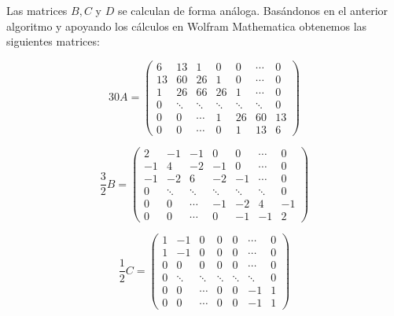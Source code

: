 Las matrices $B, C $ y $ D$ se calculan de forma análoga. Basándonos en el anterior algoritmo y apoyando los cálculos en  Wolfram Mathematica obtenemos las siguientes matrices:

\begin{equation}
\label{a}
    30A=\begin{pmatrix}
         6 & 13 & 1 & 0 & 0 & \cdots & 0\\
         13 & 60 & 26 & 1 & 0 &  \cdots & 0\\
         1 & 26 & 66 & 26 & 1 &  \cdots & 0\\
         0 & \ddots & \ddots & \ddots & \ddots &\ddots & 0\\
         0 & 0 & \cdots & 1 & 26 & 60 & 13 \\
         0 & 0 & \cdots & 0 & 1 & 13 & 6 
         \end{pmatrix}
\end{equation}

\begin{equation}
\label{B}
    \frac{3}{2}B=\begin{pmatrix}
         2 & -1 & -1 & 0 & 0 & \cdots & 0\\
        -1 & 4 & -2 & -1 & 0 &  \cdots & 0\\
        -1 & -2 & 6 & -2 & -1 &  \cdots & 0\\
         0 & \ddots & \ddots & \ddots & \ddots &\ddots & 0\\
         0 & 0 & \cdots & -1 & -2 & 4 & -1 \\
         0 & 0 & \cdots & 0 & -1 & -1 & 2 
         \end{pmatrix}
\end{equation}
    
\begin{equation}
\label{c}
    \frac{1}{2}C=\begin{pmatrix}
         1 & -1 & 0 & 0 & 0 & \cdots & 0\\
         1 & -1 & 0 & 0 & 0 &  \cdots & 0\\
         0 & 0 & 0 & 0 & 0 &  \cdots & 0\\
         0 & \ddots & \ddots & \ddots & \ddots &\ddots & 0\\
         0 & 0 & \cdots & 0 & 0 & -1 & 1 \\
         0 & 0 & \cdots & 0 & 0 & -1 & 1 
         \end{pmatrix}
\end{equation}
    
